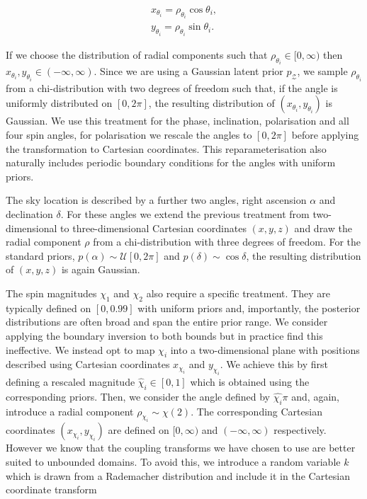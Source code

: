 \documentclass[%
 reprint,
nofootinbib,
 amsmath,amssymb,
 aps,
 prd,
]{revtex4-2}
\newcommand{\latent}{\mathcal{Z}}
\begin{document}
\begin{equation}\label{eq:cartesian}
    \begin{split}
    x_{\theta_{i}} = \rho_{\theta_{i}} \cos{\theta_{i}}, \\
    y_{\theta_{i}} = \rho_{\theta_{i}} \sin{\theta_{i}}.
    \end{split}
\end{equation}

If we choose the distribution of radial components such that $\rho_{\theta_{i}} \in [0, \infty)$ then $x_{\theta_{i}}, y_{\theta_{i}} \in (-\infty, \infty)$. Since we are using a Gaussian latent prior $p_\latent$, we sample $\rho_{\theta_i}$ from a chi-distribution with two degrees of freedom such that, if the angle is uniformly distributed on $[0, 2 \pi]$, the resulting distribution of $(x_{\theta_{i}}, y_{\theta_{i}})$ is Gaussian. We use this treatment for the phase, inclination, polarisation and all four spin angles, for polarisation we rescale the angles to $[0, 2\pi]$ before applying the transformation to Cartesian coordinates. This reparameterisation also naturally includes periodic boundary conditions for the angles with uniform priors.

The sky location is described by a further two angles, right ascension $\alpha$ and declination $\delta$. For these angles we extend the previous treatment from two-dimensional to three-dimensional Cartesian coordinates $(x, y, z)$ and draw the radial component $\rho$ from a chi-distribution with three degrees of freedom. For the standard priors, $p(\alpha) \sim \mathcal{U}[0, 2 \pi]$ and $p(\delta) \sim \cos{\delta}$, the resulting distribution of $(x, y, z)$ is again Gaussian. 


The spin magnitudes $\chi_1$ and $\chi_2$ also require a specific treatment. They are typically defined on $[0, 0.99]$ with uniform priors and, importantly, the posterior distributions are often broad and span the entire prior range. We consider applying the boundary inversion to both bounds but in practice find this ineffective. We instead opt to map $\chi_i$ into a two-dimensional plane with positions described using Cartesian coordinates $x_{\chi_i}$ and $y_{\chi_i}$. We achieve this by first defining a rescaled magnitude $\hat{\chi}_{i} \in [0, 1]$ which is obtained using the corresponding priors. Then, we consider the angle defined by $\hat{\chi_{i}}\pi$ and, again, introduce a radial component $\rho_{\chi_{i}} \sim \chi(2)$. The corresponding Cartesian coordinates $(x_{\chi_i}, y_{\chi_i})$ are defined on $[0,\infty)$ and $(-\infty, \infty)$ respectively. However we know that the coupling transforms we have chosen to use are better suited to unbounded domains. To avoid this, we introduce a random variable $k$ which is drawn from a Rademacher distribution and include it in the Cartesian coordinate transform 
\end{document}
